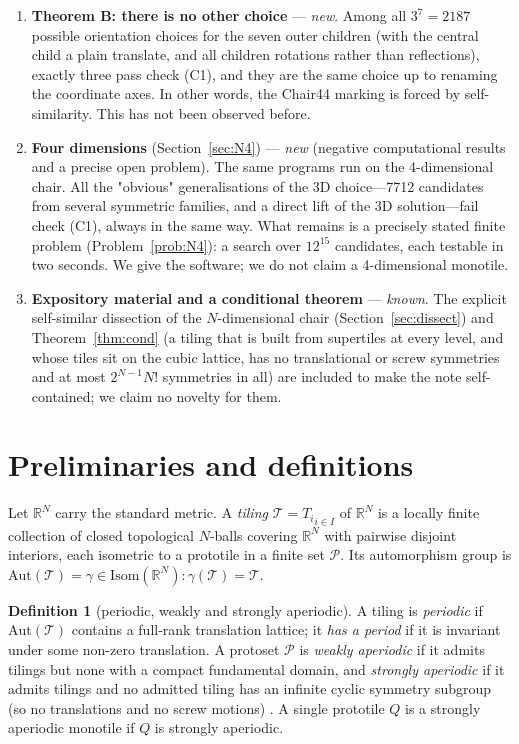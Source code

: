 \documentclass[11pt,a4paper]{article}
\theoremstyle{plain}
\theoremstyle{definition}
\newtheorem{definition}[theorem]{Definition}
\begin{document}
\begin{enumerate}
\item \textbf{Theorem B: there is no other choice} --- \emph{new}. Among all $3^7 = 2187$ possible orientation choices for the seven outer children (with the central child a plain translate, and all children rotations rather than reflections), exactly three pass check (C1), and they are the same choice up to renaming the coordinate axes. In other words, the Chair44 marking is forced by self-similarity. This has not been observed before.

\item \textbf{Four dimensions} (Section~\ref{sec:N4}) --- \emph{new} (negative computational results and a precise open problem). The same programs run on the 4-dimensional chair. All the "obvious" generalisations of the 3D choice---7712 candidates from several symmetric families, and a direct lift of the 3D solution---fail check (C1), always in the same way. What remains is a precisely stated finite problem (Problem~\ref{prob:N4}): a search over $12^15$ candidates, each testable in two seconds. We give the software; we do not claim a 4-dimensional monotile.

\item \textbf{Expository material and a conditional theorem} --- \emph{known}. The explicit self-similar dissection of the $N$-dimensional chair (Section~\ref{sec:dissect}) and Theorem~\ref{thm:cond} (a tiling that is built from supertiles at every level, and whose tiles sit on the cubic lattice, has no translational or screw symmetries and at most $2^{N-1} N!$ symmetries in all) are included to make the note self-contained; we claim no novelty for them.
\end{enumerate}

\section{Preliminaries and definitions}

Let $\mathbb{R}^N$ carry the standard metric. A \emph{tiling} $\mathcal{T} = {T_i}_{i \in I}$ of $\mathbb{R}^N$ is a locally finite collection of closed topological $N$-balls covering $\mathbb{R}^N$ with pairwise disjoint interiors, each isometric to a prototile in a finite set $\mathcal{P}$. Its automorphism group is $\mathrm{Aut}(\mathcal{T}) = {\gamma \in \mathrm{Isom}(\mathbb{R}^N) : \gamma(\mathcal{T}) = \mathcal{T}}$.

\begin{definition}[periodic, weakly and strongly aperiodic]
A tiling is \emph{periodic} if $\mathrm{Aut}(\mathcal{T})$ contains a full-rank translation lattice; it \emph{has a period} if it is invariant under some non-zero translation. A protoset $\mathcal{P}$ is \emph{weakly aperiodic} if it admits tilings but none with a compact fundamental domain, and \emph{strongly aperiodic} if it admits tilings and no admitted tiling has an infinite cyclic symmetry subgroup (so no translations and no screw motions) \cite{gs2026,gs87}. A single prototile $Q$ is a strongly aperiodic monotile if ${Q}$ is strongly aperiodic.
\end{definition}
\end{document}
